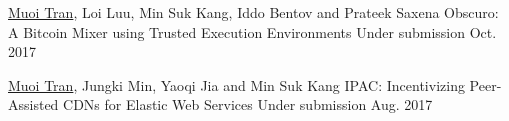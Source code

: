

\begin{cventries}

  \cventry
    {\underline{Muoi Tran}, Loi Luu, Min Suk Kang, Iddo Bentov and Prateek Saxena } %
    {Obscuro: A Bitcoin Mixer using Trusted Execution Environments} %
    {Under submission} %
    {Oct. 2017} %
    {
    }

  \cventry
    {\underline{Muoi Tran}, Jungki Min, Yaoqi Jia and Min Suk Kang} %
    {IPAC: Incentivizing Peer-Assisted CDNs for Elastic Web Services} %
    {Under submission} %
    {Aug. 2017} %
    {
    }

\end{cventries}
